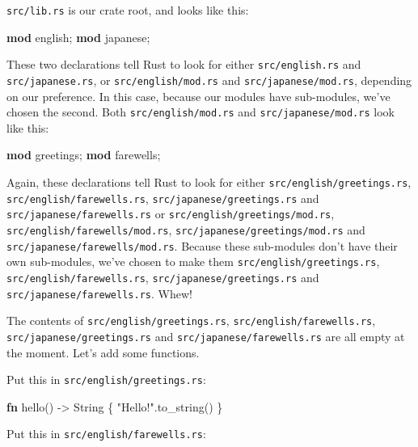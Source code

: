 \documentclass[a4paper,]{book}
\newenvironment{Shaded}{\begin{snugshade}}{\end{snugshade}}
\newcommand{\KeywordTok}[1]{\textcolor[rgb]{0.13,0.29,0.53}{\textbf{{#1}}}}
\newcommand{\DataTypeTok}[1]{\textcolor[rgb]{0.13,0.29,0.53}{{#1}}}
\newcommand{\StringTok}[1]{\textcolor[rgb]{0.31,0.60,0.02}{{#1}}}
\newcommand{\NormalTok}[1]{{#1}}
\begin{document}
\texttt{src/lib.rs} is our crate root, and looks like this:

\begin{Shaded}
\begin{Highlighting}[]
\KeywordTok{mod} \NormalTok{english;}
\KeywordTok{mod} \NormalTok{japanese;}
\end{Highlighting}
\end{Shaded}

These two declarations tell Rust to look for either
\texttt{src/english.rs} and \texttt{src/japanese.rs}, or
\texttt{src/english/mod.rs} and \texttt{src/japanese/mod.rs}, depending
on our preference. In this case, because our modules have sub-modules,
we've chosen the second. Both \texttt{src/english/mod.rs} and
\texttt{src/japanese/mod.rs} look like this:

\begin{Shaded}
\begin{Highlighting}[]
\KeywordTok{mod} \NormalTok{greetings;}
\KeywordTok{mod} \NormalTok{farewells;}
\end{Highlighting}
\end{Shaded}

Again, these declarations tell Rust to look for either
\texttt{src/english/greetings.rs}, \texttt{src/english/farewells.rs},
\texttt{src/japanese/greetings.rs} and
\texttt{src/japanese/farewells.rs} or
\texttt{src/english/greetings/mod.rs},
\texttt{src/english/farewells/mod.rs},
\texttt{src/japanese/greetings/mod.rs} and
\texttt{src/japanese/farewells/mod.rs}. Because these sub-modules don't
have their own sub-modules, we've chosen to make them
\texttt{src/english/greetings.rs}, \texttt{src/english/farewells.rs},
\texttt{src/japanese/greetings.rs} and
\texttt{src/japanese/farewells.rs}. Whew!

The contents of \texttt{src/english/greetings.rs},
\texttt{src/english/farewells.rs}, \texttt{src/japanese/greetings.rs}
and \texttt{src/japanese/farewells.rs} are all empty at the moment.
Let's add some functions.

Put this in \texttt{src/english/greetings.rs}:

\begin{Shaded}
\begin{Highlighting}[]
\KeywordTok{fn} \NormalTok{hello() -> }\DataTypeTok{String} \NormalTok{\{}
    \StringTok{"Hello!"}\NormalTok{.to_string()}
\NormalTok{\}}
\end{Highlighting}
\end{Shaded}

Put this in \texttt{src/english/farewells.rs}:
\end{document}
